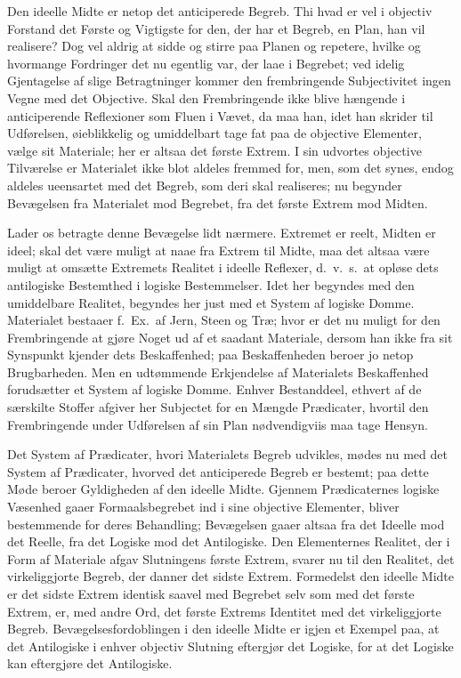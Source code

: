 \documentclass[12pt]{book}
\newcommand{\opage}[1]{\marginnote{\footnotesize\textit{[#1]}}}
\begin{document}
Den ideelle Midte er netop det anticiperede Begreb. Thi hvad er vel i objectiv Forstand det Første og Vigtigste for den, der har et Begreb, en Plan, han vil realisere? Dog vel aldrig at sidde og stirre paa Planen og repetere, hvilke og hvormange Fordringer det nu egentlig var, der laae i Begrebet; ved idelig Gjentagelse af slige Betragtninger kommer den frembringende Subjectivitet ingen Vegne med det Objective. Skal den Frembringende ikke blive hængende i anticiperende Reflexioner som Fluen i Vævet, da maa han, idet han skrider til Udførelsen, øieblikkelig og umiddelbart tage fat paa de objective Elementer, vælge sit Materiale; her er altsaa det
\opage{404}første Extrem. I sin udvortes objective Tilværelse er Materialet ikke blot aldeles fremmed for, men, som det synes, endog aldeles ueensartet med det Begreb, som deri skal realiseres; nu begynder Bevægelsen fra Materialet mod Begrebet, fra det første Extrem mod Midten.

Lader os betragte denne Bevægelse lidt nærmere. Extremet er reelt, Midten er ideel; skal det være muligt at naae fra Extrem til Midte, maa det altsaa være muligt at omsætte Extremets Realitet i ideelle Reflexer, d.\ v.\ s.\ at opløse dets antilogiske Bestemthed i logiske Bestemmelser. Idet her begyndes med den umiddelbare Realitet, begyndes her just med et System af logiske Domme. Materialet bestaaer f.\ Ex.\ af Jern, Steen og Træ; hvor er det nu muligt for den Frembringende at gjøre Noget ud af et saadant Materiale, dersom han ikke fra sit Synspunkt kjender dets Beskaffenhed; paa Beskaffenheden beroer jo netop Brugbarheden. Men en udtømmende Erkjendelse af Materialets Beskaffenhed forudsætter et System af logiske Domme. Enhver Bestanddeel, ethvert af de særskilte Stoffer afgiver her Subjectet for en Mængde Prædicater, hvortil den Frembringende under Udførelsen af sin Plan nødvendigviis maa tage Hensyn.

Det System af Prædicater, hvori Materialets Begreb udvikles, mødes nu med det System af Prædicater, hvorved det anticiperede Begreb er bestemt; paa dette Møde beroer Gyldigheden af den ideelle Midte. Gjennem Prædicaternes logiske Væsenhed gaaer Formaalsbegrebet ind i sine objective Elementer, bliver bestemmende for deres Behandling; Bevægelsen gaaer altsaa fra det Ideelle mod det Reelle, fra det Logiske mod det Antilogiske. Den Elementernes Realitet, der i Form af Materiale afgav Slutningens første Extrem, svarer nu til den Realitet, det virkeliggjorte Begreb, der danner det sidste Extrem. Formedelst den ideelle Midte er det sidste Extrem identisk saavel med Begrebet selv som med det første Extrem, er, med andre Ord, det første Extrems Identitet med
\opage{405}det virkeliggjorte Begreb. Bevægelsesfordoblingen i den ideelle Midte er igjen et Exempel paa, at det Antilogiske i enhver objectiv Slutning eftergjør det Logiske, for at det Logiske kan eftergjøre det Antilogiske.
\end{document}
